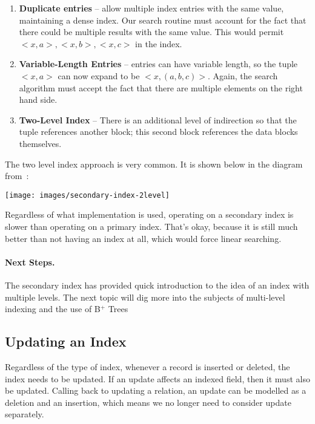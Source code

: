\documentclass[a4paper]{report}
\begin{document}
\begin{enumerate}
	\item \textbf{Duplicate entries} -- allow multiple index entries with the same value, maintaining a dense index. Our search routine must account for the fact that there could be multiple results with the same value. This would permit $<x, a>, <x, b>, <x, c>$ in the index.
	\item \textbf{Variable-Length Entries} -- entries can have variable length, so the tuple $<x, a>$ can now expand to be $<x, (a, b, c)>$. Again, the search algorithm must accept the fact that there are multiple elements on the right hand side.
	\item \textbf{Two-Level Index} -- There is an additional level of indirection so that the tuple references another block; this second block references the data blocks themselves.
\end{enumerate}

The two level index approach is very common. It is shown below in the diagram from~\cite{fds}: 

\begin{center}
\texttt{[image: images/secondary-index-2level]}
\end{center}

Regardless of what implementation is used, operating on a secondary index is slower than operating on a primary index. That's okay, because it is still much better than not having an index at all, which would force linear searching. 

\paragraph{Next Steps.}
The secondary index has provided quick introduction to the idea of an index with multiple levels. The next topic will dig more into the subjects of multi-level indexing and the use of B$^{+}$ Trees 

\subsection*{Updating an Index}

Regardless of the type of index, whenever a record is inserted or deleted, the index needs to be updated. If an update affects an indexed field, then it must also be updated. Calling back to updating a relation, an update can be modelled as a deletion and an insertion, which means we no longer need to consider update separately.
\end{document}
